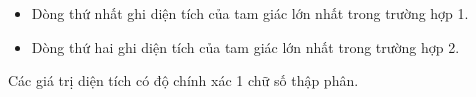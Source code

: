 \begin{itemize}
	\item     Dòng thứ nhất ghi diện tích của tam giác lớn nhất trong trường hợp 1.   
	\item     Dòng thứ hai ghi diện tích của tam giác lớn nhất trong trường hợp 2.   
\end{itemize}

   Các giá trị diện tích có độ chính xác 1 chữ số thập phân.